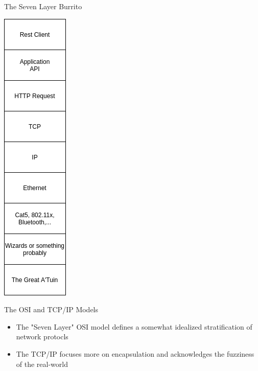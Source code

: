 \documentclass[presentation]{beamer}
\begin{document}
\begin{frame}[label={sec:orgcfcbd78}]{The Seven Layer Burrito}
\begin{center}
\includegraphics[height=0.8\textheight]{./osi-model-extended.png}
\end{center}
\end{frame}

\begin{frame}[label={sec:org9c121c6}]{The OSI and TCP/IP Models}
\begin{itemize}
\item The "Seven Layer" OSI model defines a somewhat idealized stratification of network protocls
\item The TCP/IP focuses more on encapsulation and acknowledges the fuzziness of the real-world
\end{itemize}
\end{frame}
\end{document}

